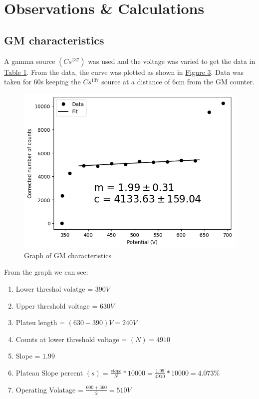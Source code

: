 \section{Observations \& Calculations}
	\subsection{GM characteristics}
		A gamma source $(Cs^{137})$ was used and the voltage was varied to get the data in \hyperref[tab:1]{Table 1}. From the data, the curve was plotted as shown in \hyperref[graph:1]{Figure 3}. Data was taken for 60s keeping the $Cs^{137}$ source at a distance of 6cm from the GM counter.

		
		\begin{figure}[h]
			\centering
			\includegraphics[width=0.9\columnwidth]{images/g1.png}
			\caption{Graph of GM characteristics}
			\label{graph:1}
		\end{figure}

		From the graph we can see:
		\begin{enumerate}
			\item Lower threshol volatge = $390 V$
			\item Upper threshold voltage = $630 V$
			\item Plateu length = $(630 - 390) V = 240 V$
			\item Counts at lower threshold voltage = $(N) = 4910$
			\item Slope = $1.99$
			\item Plateau Slope percent $(s) = \frac{slope}{N}*10000 = \frac{1.99}{4910}*10000 = 4.073\%$
			\item Operating Volatage = $\frac{600+360}{2} = 510 V$
		\end{enumerate}

